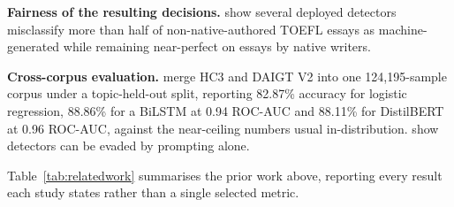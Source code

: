 \documentclass[conference,a4paper]{IEEEtran}
\begin{document}
\textbf{Fairness of the resulting decisions.} \citet{Liang2023gpt} show several deployed detectors misclassify more than half of non-native-authored TOEFL essays as machine-generated while remaining near-perfect on essays by native writers.

\textbf{Cross-corpus evaluation.} \citet{Alikhanov2026generated} merge HC3 and DAIGT V2 into one 124,195-sample corpus under a topic-held-out split, reporting 82.87\% accuracy for logistic regression, 88.86\% for a BiLSTM at 0.94 ROC-AUC and 88.11\% for DistilBERT at 0.96 ROC-AUC, against the near-ceiling numbers usual in-distribution. \citet{Lu2023large} show detectors can be evaded by prompting alone.

Table~\ref{tab:relatedwork} summarises the prior work above, reporting every result each study states rather than a single selected metric.
\end{document}
